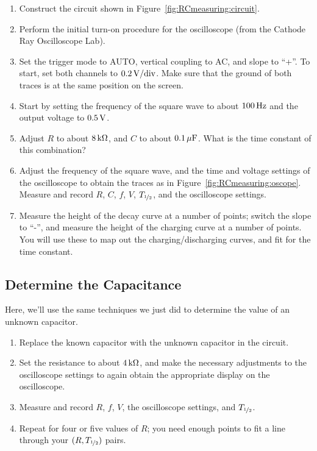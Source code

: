 \documentclass[12pt]{article}
\newcommand{\halflife}{\ensuremath{T_{\nicefrac{1}{2}}}\xspace}
\begin{document}
\begin{enumerate}
\item Construct the circuit shown in
  Figure~\ref{fig:RCmeasuring:circuit}.
\item Perform the initial turn-on procedure for the oscilloscope (from
  the Cathode Ray Oscilloscope Lab).
\item Set the trigger mode to AUTO, vertical coupling to AC, and slope
  to ``+''.  To start, set both channels to $\unit[0.2]{V/div}$.  Make
  sure that the ground of both traces is at the same position on the
  screen. 
\item Start by setting the frequency of the square wave to about
  $\unit[100]{Hz}$ and the output voltage to $\unit[0.5]{V}$.
\item Adjust $R$ to about $\unit[8]{k\Omega}$, and $C$ to about
  $\unit[0.1]{\mu F}$.  What is the time constant of this combination?
\item Adjust the frequency of the square wave, and the time and
  voltage settings of the oscilloscope to obtain the traces as in
  Figure~\ref{fig:RCmeasuring:oscope}.  Measure and record $R$, $C$,
  $f$, $V$, \halflife, and the oscilloscope settings.
\item Measure the height of the decay curve at a number of points;
  switch the slope to ``-'', and measure the height of the charging
  curve at a number of points.  You will use these to map out the
  charging/discharging curves, and fit for the time constant.
\end{enumerate}

\subsection{Determine the Capacitance}
\label{sec:capacitance}

Here, we'll use the same techniques we just did to determine the value
of an unknown capacitor.

\begin{enumerate}
\item Replace the known capacitor with the unknown capacitor in the
  circuit.
\item Set the resistance to about $\unit[4]{k\Omega}$, and make the
  necessary adjustments to the oscilloscope settings to again obtain
  the appropriate display on the oscilloscope.
\item Measure and record $R$, $f$, $V$, the oscilloscope settings, and
  \halflife.
\item Repeat for four or five values of $R$; you need enough points to
  fit a line through your $(R,\halflife)$ pairs.
\end{enumerate}
\end{document}
